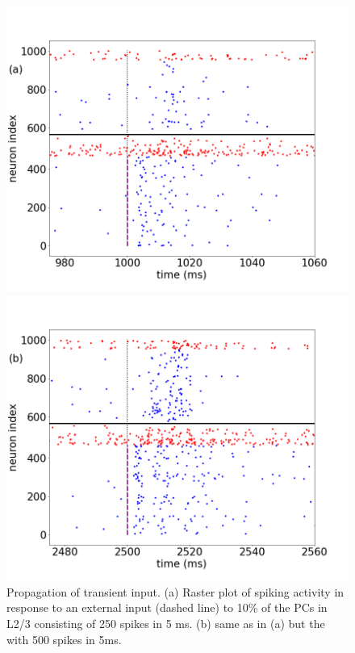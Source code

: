 \begin{figure}[H]
    \centering
    \begin{minipage}[b]{0.45\textwidth}
    \includegraphics[scale=0.23]{regular6a.png}
    \end{minipage}
    \hfill
    \begin{minipage}[b]{0.5\textwidth}
        \includegraphics[scale=0.23]{regular6b.png}
    \end{minipage}
    \caption{Propagation of transient input. (a) Raster plot of spiking activity in response to an external input (dashed line) to 10\% of the PCs in L2/3 consisting of 250 spikes in 5 ms. (b) same as in (a) but the with 500 spikes in 5ms.}
    \label{fig:regular1}
\end{figure}

